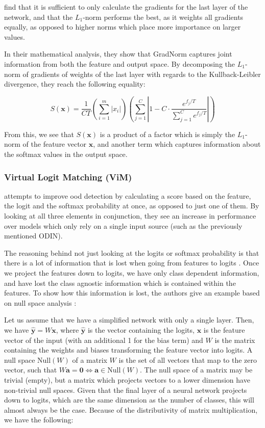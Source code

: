 \documentclass[UKenglish]{uiomasterthesis} %
\theoremstyle{definition}
\begin{document}
\cite{gradnorm} find that it is sufficient to only calculate the gradients for the last layer of the network, and that the $L_1$-norm performs the best, as it weights all gradients equally, as opposed to higher norms which place more importance on larger values.

In their mathematical analysis, they show that GradNorm captures joint information from both the feature and output space. By decomposing the $L_1$-norm of gradients of weights of the last layer with regards to the Kullback-Leibler divergence, they reach the following equality:

\begin{equation}
S(\bm{x}) = \frac{1}{CT}  \left(\sum_{i=1}^m |x_i|\right) \left(\sum_{j=1}^C \left|1 - C \cdot \frac{e^{f_j / T}}{\sum_{j=1}^C e^{{f_{j}} / T}}\right|\right)
\label{eq:decomp}
\end{equation}

From this, we see that $S(\bm{x})$ is a product of a factor which is simply the $L_1$-norm of the feature vector $\bm{x}$, and another term which captures information about the softmax values in the output space.
\\

\subsubsection{Virtual Logit Matching (ViM)}

\cite{vim} attempts to improve \ac{ood} detection by calculating a score based on the feature, the logit and the softmax probability at once, as opposed to just one of them. By looking at all three elements in conjunction, they see an increase in performance over models which only rely on a single input source (such as the previously mentioned ODIN).

The reasoning behind not just looking at the logits or softmax probability is that there is a lot of information that is lost when going from features to logits \cite{vim}. Once we project the features down to logits, we have only class dependent information, and have lost the class agnostic information which is contained within the features. To show how this information is lost, the authors give an example based on null space analysis \cite{nusa}:

Let us assume that we have a simplified network with only a single layer. Then, we have $\hat{\bm{y}} = W \bm{x}$, where $\hat{\bm{y}}$ is the vector containing the logits, $\bm{x}$ is the feature vector of the input (with an additional 1 for the bias term) and $W$ is the matrix containing the weights and biases transforming the feature vector into logits. A null space $\text{Null}(W)$ of a matrix $W$ is the set of all vectors that map to the zero vector, such that $W \bm{a} = \bm{0} \iff \bm{a} \in \text{Null}(W)$. The null space of a matrix may be trivial (empty), but a matrix which projects vectors to a lower dimension have non-trivial null spaces. Given that the final layer of a neural network projects down to logits, which are the same dimension as the number of classes, this will almost always be the case. Because of the distributivity of matrix multiplication, we have the following:
\end{document}

